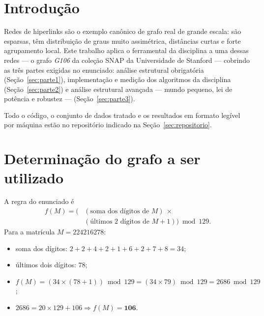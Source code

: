 \documentclass[sigconf]{webmedia}
\begin{document}

\maketitle

\section{Introdução}

Redes de hiperlinks são o exemplo canônico de grafo real de grande escala:
são esparsas, têm distribuição de graus muito assimétrica, distâncias
curtas e forte agrupamento local. Este trabalho aplica o ferramental da
disciplina a uma dessas redes --- o grafo \textit{G106} da coleção SNAP da
Universidade de Stanford \cite{snap} --- cobrindo as três partes exigidas no enunciado:
análise estrutural obrigatória (Seção~\ref{sec:parte1}), implementação e
medição dos algoritmos da disciplina (Seção~\ref{sec:parte2}) e análise
estrutural avançada --- mundo pequeno, lei de potência e robustez ---
(Seção~\ref{sec:parte3}).

Todo o código, o conjunto de dados tratado e os resultados em formato
legível por máquina estão no repositório indicado na
Seção~\ref{sec:repositorio}.

\section{Determinação do grafo a ser utilizado}

A regra do enunciado é
\begin{equation*}
\begin{split}
f(M) = \bigl(&(\text{soma dos dígitos de } M)\ \times\\
             &(\text{últimos 2 dígitos de } M + 1)\bigr) \bmod 129 .
\end{split}
\end{equation*}
Para a matrícula $M = 224216278$:

\begin{itemize}[nosep]
  \item soma dos dígitos: $2+2+4+2+1+6+2+7+8 = 34$;
  \item últimos dois dígitos: $78$;
  \item $f(M) = (34 \times (78+1)) \bmod 129 = (34\times 79)\bmod 129
        = 2686 \bmod 129$;
  \item $2686 = 20\times129 + 106 \Rightarrow f(M) = \mathbf{106}$.
\end{itemize}
\end{document}
